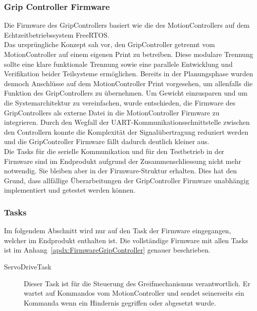 \documentclass[main.tex]{subfiles} %
\begin{document}

\subsubsection{Grip Controller Firmware}

Die Firmware des GripControllers basiert wie die des MotionControllers auf dem Echtzeitbetriebssystem FreeRTOS.\\
Das ursprüngliche Konzept sah vor, den GripController getrennt vom MotionController auf einem
eigenen Print zu betreiben. Diese modulare Trennung sollte eine klare funktionale Trennung
sowie eine parallele Entwicklung und Verifikation beider Teilsysteme ermöglichen. Bereits in der Planungsphase
wurden dennoch Anschlüsse auf dem MotionController Print vorgesehen, um allenfalls die Funktion des
GripControllers zu übernehmen. Um Gewicht einzusparen und um die Systemarchitektur zu vereinfachen,
wurde entschieden, die Firmware des GripControllers als externe Datei in die MotionController Firmware
zu integrieren. Durch den Wegfall der UART-Kommunikationsschnittstelle zwischen den Controllern
konnte die Komplexität der Signalübertragung reduziert werden und die GripController Firmware fällt dadurch
deutlich kleiner aus.\\

Die Tasks für die serielle Kommunikation und für den Testbetrieb in der Firmware sind im Endprodukt aufgrund
der Zusammenschliessung nicht mehr notwendig. Sie bleiben aber 
in der Firmware-Struktur erhalten. Dies hat den Grund, dass allfällige Überarbeitungen der GripController
Firmware unabhängig implementiert und getestet werden können.\\

\subsubsection*{Tasks}
Im folgendem Abschnitt wird nur auf den Task der Firmware eingegangen, welcher im Endprodukt enthalten ist.
Die vollständige Firmware mit allen Tasks ist im Anhang~\ref{apdx:FirmwareGripController} genauer beschrieben.

\begin{description}
    \item[ServoDriveTask] Dieser Task ist für die Steuerung des Greifmechanismus verantwortlich. Er wartet auf
    Kommandos vom MotionController und sendet seinerseits ein Kommanda wenn ein Hindernis gegriffen oder abgesetzt
    wurde.
\end{description}
\end{document}
